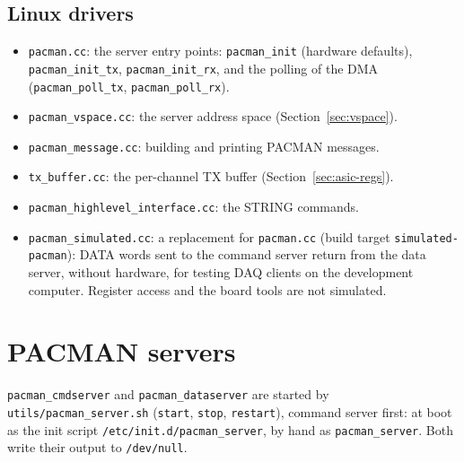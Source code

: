 \documentclass[12pt]{article}
\newcommand{\f}[1]{\texttt{#1}}
\begin{document}
\subsection{Linux drivers}

\begin{itemize}
\item \f{pacman.cc}:  the server entry points:  \f{pacman\_init} (hardware defaults), \f{pacman\_init\_tx},
  \f{pacman\_init\_rx}, and the polling of the DMA (\f{pacman\_poll\_tx}, \f{pacman\_poll\_rx}).
\item \f{pacman\_vspace.cc}:  the server address space (Section~\ref{sec:vspace}).
\item \f{pacman\_message.cc}:  building and printing PACMAN messages.
\item \f{tx\_buffer.cc}:  the per-channel TX buffer (Section~\ref{sec:asic-regs}).
\item \f{pacman\_highlevel\_interface.cc}:  the STRING commands.
\item \f{pacman\_simulated.cc}:  a replacement for \f{pacman.cc} (build target
  \f{simulated-pacman}):  DATA words sent to the command server return from the data server, without
  hardware, for testing DAQ clients on the development computer.  Register access and the board tools
  are not simulated.
\end{itemize}

\section{PACMAN servers}\label{sec:servers}

\f{pacman\_cmdserver} and \f{pacman\_dataserver} are started by \f{utils/pacman\_server.sh}
(\f{start}, \f{stop}, \f{restart}), command server first:  at boot as the init script
\f{/etc/init.d/pacman\_server}, by hand as \f{pacman\_server}.  Both write
their output to \f{/dev/null}.
\end{document}
